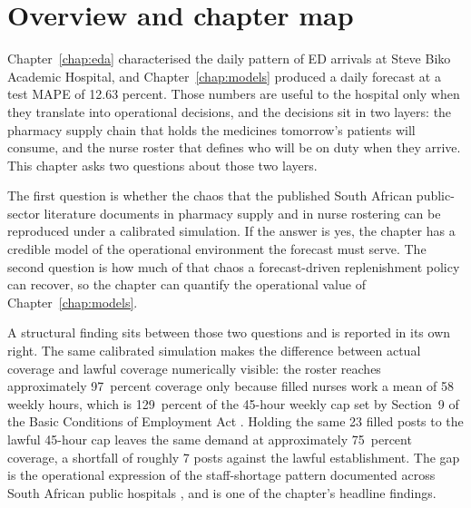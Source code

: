 \section{Overview and chapter map}
\label{sec:ch7_overview}

Chapter~\ref{chap:eda} characterised the daily pattern of ED arrivals at Steve Biko Academic Hospital, and Chapter~\ref{chap:models} produced a daily forecast at a test MAPE of 12.63 percent. Those numbers are useful to the hospital only when they translate into operational decisions, and the decisions sit in two layers: the pharmacy supply chain that holds the medicines tomorrow's patients will consume, and the nurse roster that defines who will be on duty when they arrive. This chapter asks two questions about those two layers.

The first question is whether the chaos that the published South African public-sector literature documents in pharmacy supply and in nurse rostering can be reproduced under a calibrated simulation. If the answer is yes, the chapter has a credible model of the operational environment the forecast must serve. The second question is how much of that chaos a forecast-driven replenishment policy can recover, so the chapter can quantify the operational value of Chapter~\ref{chap:models}.

A structural finding sits between those two questions and is reported in its own right. The same calibrated simulation makes the difference between actual coverage and lawful coverage numerically visible: the roster reaches approximately 97~percent coverage only because filled nurses work a mean of 58 weekly hours, which is 129~percent of the 45-hour weekly cap set by Section~9 of the Basic Conditions of Employment Act \parencite{bcea1997}. Holding the same 23 filled posts to the lawful 45-hour cap leaves the same demand at approximately 75~percent coverage, a shortfall of roughly 7 posts against the lawful establishment. The gap is the operational expression of the staff-shortage pattern documented across South African public hospitals \parencite{malakoane2020public, abrahams2022}, and is one of the chapter's headline findings.

